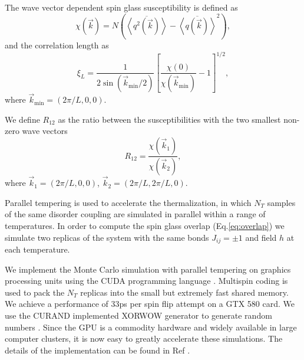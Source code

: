 The wave vector dependent spin glass susceptibility is defined as \cite{Marinari-etal-1998}
\begin{equation}
  \label{eq:chi}
  \chi(\vec{k})= N(\overline{\left<q^2(\vec{k})\right>}-\overline{\left<q(\vec{k})\right>}^2),
\end{equation}
and the correlation length as 
\begin{equation}
  \label{eq:corr}
  \xi_L=\frac{1}{2\sin(\vec{k}_{\mathrm{min}}/2)}\left[\frac{\chi(0)}{\chi(\vec{k}_{\mathrm{min}})}-1\right]^{1/2},
\end{equation}
where $\vec{k}_{\mathrm{min}}=(2\pi/L,0,0)$. 

We define $R_{12}$ as the ratio between the susceptibilities with the two smallest non-zero wave 
vectors \cite{Banos-2012}
\begin{equation}
  \label{eq:r12}
  R_{12}=\frac{\chi(\vec{k}_1)}{\chi(\vec{k}_2)},
\end{equation}
where $\vec{k}_1=(2\pi/L,0,0)$, $\vec{k}_2=(2\pi/L,2\pi/L,0)$.


Parallel tempering\cite{Hukushima-Nemoto1996,Marinari-Parisi1992} is used to accelerate the thermalization, 
in which $N_T$ samples of the same disorder coupling are simulated in parallel within a range 
of temperatures. In order to compute 
the spin glass overlap (Eq.\ref{eq:overlap}) we simulate two replicas 
of the system with the same bonds $J_{ij}=\pm 1$ and field $h$ at each temperature. 

We implement the Monte Carlo simulation with parallel tempering on graphics 
processing units using the CUDA programming language \cite{Nickolls:2008:SPP:1365490.1365500}. 
Multispin coding\cite{PhysRevLett.42.1390,Zorn1981337} is used 
to pack the $N_T$ replicas into the small but extremely fast shared 
memory. We achieve a performance of 33ps per spin flip attempt on a GTX 580 card.
We use the CURAND implemented XORWOW generator to generate random numbers \cite{curand}.
Since the GPU is a commodity hardware and widely available in large
computer clusters, it is now easy to greatly accelerate these 
simulations. 
The details of the implementation can be found in 
Ref \cite{Fang-Feng-Tam-etal-2013}. 



